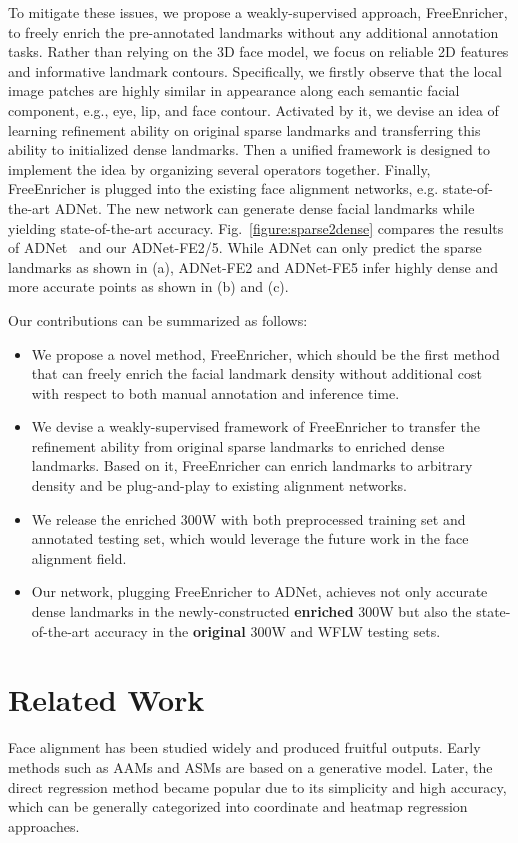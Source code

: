 \documentclass[letterpaper]{article} \usepackage{aaai23}  \usepackage{times}  \usepackage{helvet}  \usepackage{courier}  \usepackage[hyphens]{url}  \usepackage{graphicx} \urlstyle{rm} \def\UrlFont{\rm}  \usepackage{natbib}  \usepackage{caption} \frenchspacing  \setlength{\pdfpagewidth}{8.5in}  \setlength{\pdfpageheight}{11in}  \usepackage{algorithm}
\begin{document}
To mitigate these issues, we propose a weakly-supervised approach, FreeEnricher, to freely enrich the pre-annotated landmarks without any additional annotation tasks. 
Rather than relying on the 3D face model, we focus on reliable 2D features and informative landmark contours.
Specifically, we firstly observe that the local image patches are highly similar in appearance along each semantic facial component, e.g., eye, lip, and face contour.
Activated by it, we devise an idea of learning refinement ability on original sparse landmarks and transferring this ability to initialized dense landmarks.
Then a unified framework is designed to implement the idea by organizing several operators together.
Finally, FreeEnricher is plugged into the existing face alignment networks, e.g. state-of-the-art ADNet.
The new network can generate dense facial landmarks while yielding state-of-the-art accuracy.
Fig.~\ref{figure:sparse2dense} compares the results of ADNet~\cite{huang2021adnet} and our ADNet-FE2/5. While ADNet can only predict the sparse landmarks as shown in (a), ADNet-FE2 and ADNet-FE5 infer highly dense and more accurate points as shown in (b) and (c).

Our contributions can be summarized as follows:
\begin{itemize}
    \item We propose a novel method, FreeEnricher, which should be the first method that can freely enrich the facial landmark density without additional cost with respect to both manual annotation and inference time.
\item We devise a weakly-supervised framework of FreeEnricher to transfer the refinement ability from original sparse landmarks to enriched dense landmarks. Based on it, FreeEnricher can enrich landmarks to arbitrary density and be plug-and-play to existing alignment networks.
    \item We release the enriched 300W with both preprocessed training set and annotated testing set, which would leverage the future work in the face alignment field.
    \item Our network, plugging FreeEnricher to ADNet, achieves not only accurate dense landmarks in the newly-constructed \textbf{enriched} 300W but also the state-of-the-art accuracy in the \textbf{original} 300W and WFLW testing sets.
\end{itemize}



\section{Related Work}
\label{sec:related_work} 
Face alignment has been studied widely and produced fruitful outputs. Early methods such as AAMs \cite{cootes2001active,saragih2007nonlinear,matthews2004active} and ASMs \cite{cootes1992active,cootes1995active,milborrow2008locating} are based on a generative model.
Later, the direct regression method became popular due to its simplicity and high accuracy, which can be generally categorized into coordinate and heatmap regression approaches.
\end{document}
